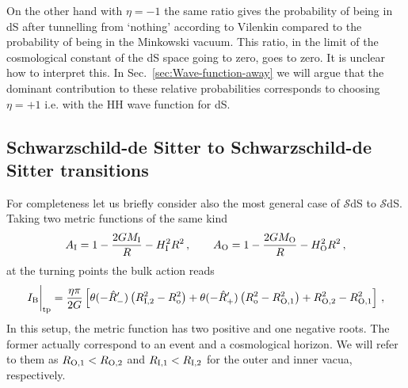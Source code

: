 \documentclass[11pt,a4paper]{article}
\newcommand{\be}{\begin{equation}}
\newcommand{\ee}{\end{equation}}
\begin{document}
On the other hand with $\eta=-1$ the same ratio gives the probability of being in dS after tunnelling from `nothing' according to Vilenkin compared to the probability of being in the Minkowski vacuum. This ratio, in the limit of the cosmological constant of the dS space going to zero, goes to zero. It is unclear how to interpret this. In Sec.~\ref{sec:Wave-function-away} we will argue that the dominant contribution to these relative probabilities corresponds to choosing $\eta=+1$ i.e. with the HH wave function for dS.

\subsection{Schwarzschild-de Sitter to Schwarzschild-de Sitter transitions}

For completeness let us briefly consider also the most general case of $\mathcal{S}$dS to $\mathcal{S}$dS. Taking two metric functions of the same kind
\be
A_{\rm I} = 1 - \frac{2GM_{\rm I}}{R} - H_{\rm I}^2 R^2 \,, \qquad
A_{\rm O} = 1 - \frac{2GM_{\rm O}}{R} - H_{\rm O}^2 R^2 \,,
\ee
at the turning points the bulk action reads 
\begin{equation}
\label{eq:BulkActionGeneric}
I_{\rm B} \bigg|_{\rm tp} = \frac{\eta \pi}{2G} \left[\theta(-\hat R^{\prime}_{-})\left(R_{\rm{I},2}^{2}-R_{\rm o}^2\right) + \theta(-\hat R^{\prime}_{+})\left(R_{\rm o}^2 - R_{\rm{O},1}^{2}\right) + R_{\rm{O},2}^{2} - R_{\rm{O},1}^{2}\right] \,,
\end{equation} 
In this setup, the metric function has two positive and one negative roots. The former actually correspond to an event and a cosmological horizon. We will refer to them as $R_{\rm{O},1} < R_{\rm{O},2}$ and $R_{\rm{I},1} < R_{\rm{I},2}$ for the outer and inner vacua, respectively.
\end{document}
